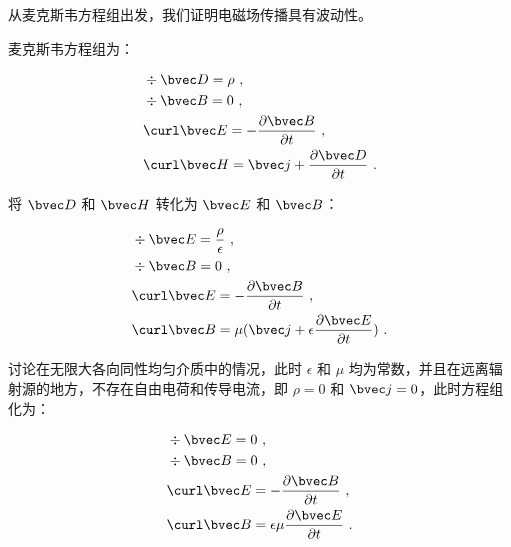 
\begin{issues}
\issueDraft
{}
\end{issues}


从麦克斯韦方程组出发，我们证明电磁场传播具有波动性。

麦克斯韦方程组为：

\begin{equation}
\begin{aligned}
& \div \bvec D = \rho ~, \\
& \div \bvec B = 0 ~, \\
& \curl \bvec E = -\frac{\partial \bvec B}{\partial t} ~, \\
& \curl \bvec H = \bvec j + \frac{\partial \bvec D}{\partial t} ~.
\end{aligned}
\end{equation}

将 $\bvec D$ 和 $\bvec H$ 转化为 $\bvec E$ 和 $\bvec B$：

\begin{equation}
\begin{aligned}
& \div \bvec E = \frac{\rho}{\epsilon} ~, \\
& \div \bvec B = 0 ~, \\
& \curl \bvec E = -\frac{\partial \bvec B}{\partial t} ~, \\
& \curl \bvec B = \mu(\bvec j + \epsilon \frac{\partial \bvec E}{\partial t}) ~.
\end{aligned}
\end{equation}

讨论在无限大各向同性均匀介质中的情况，此时 $\epsilon$ 和 $\mu$ 均为常数，并且在远离辐射源的地方，不存在自由电荷和传导电流，即 $\rho = 0$ 和 $\bvec j = 0$，此时方程组化为：

\begin{equation}
\begin{aligned}
& \div \bvec E = 0 ~, \\
& \div \bvec B = 0 ~, \\
& \curl \bvec E = -\frac{\partial \bvec B}{\partial t} ~, \\
& \curl \bvec B = \epsilon \mu\frac{\partial \bvec E}{\partial t} ~.
\end{aligned}
\end{equation}

